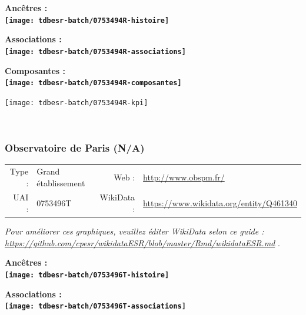 \documentclass[12pt,french,]{article}
\begin{document}
\vspace{1cm}  
\begin{minipage}[b]{0.50\textwidth}\begin{center} \bf Ancêtres : \\  
\texttt{[image: tdbesr-batch/0753494R-histoire]} \end{center}\end{minipage}\begin{minipage}[b]{0.50\textwidth}\begin{center} \bf Associations : \\  
\texttt{[image: tdbesr-batch/0753494R-associations]} \end{center}\end{minipage}

\hrulefill

\begin{center} \bf Composantes : \\  
\texttt{[image: tdbesr-batch/0753494R-composantes]} \end{center}

\begin{center}\texttt{[image: tdbesr-batch/0753494R-kpi]} \end{center}\checkoddpage

\ifoddpage \fi ~\newpage  

\hypertarget{observatoire-de-paris-na}{%
\subsubsection{Observatoire de Paris
(N/A)}\label{observatoire-de-paris-na}}

\begin{tabular*}{\textwidth}{rp{5cm}rl}  
\hline  
Type : & Grand établissement & Web : &\href{http://www.obspm.fr/}{http://www.obspm.fr/} \\  
UAI : & 0753496T & WikiData : & \href{https://www.wikidata.org/entity/Q461340}{https://www.wikidata.org/entity/Q461340} \\  
\hline  
\end{tabular*}

\textit{\scriptsize Pour améliorer ces graphiques, veuillez éditer WikiData selon ce guide :  \href{https://github.com/cpesr/wikidataESR/blob/master/Rmd/wikidataESR.md}{https://github.com/cpesr/wikidataESR/blob/master/Rmd/wikidataESR.md}}
.

\vspace{1cm}  
\begin{minipage}[b]{0.50\textwidth}\begin{center} \bf Ancêtres : \\  
\texttt{[image: tdbesr-batch/0753496T-histoire]} \end{center}\end{minipage}\begin{minipage}[b]{0.50\textwidth}\begin{center} \bf Associations : \\  
\texttt{[image: tdbesr-batch/0753496T-associations]} \end{center}\end{minipage}
\end{document}
